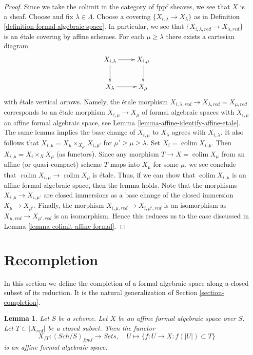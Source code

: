 \documentclass{stacks-project}
\theoremstyle{plain}
\newtheorem{lemma}[subsection]{Lemma}
\theoremstyle{definition}
\theoremstyle{remark}
\numberwithin{equation}{subsection}
\def\colim{\mathop{\mathrm{colim}}\nolimits}
\def\Sch{\mathit{Sch}}
\begin{document}
\begin{proof}
Since we take the colimit in the category of fppf sheaves, we
see that $X$ is a sheaf. Choose and fix $\lambda \in \Lambda$. Choose
a covering $\{X_{i, \lambda} \to X_\lambda\}$ as in Definition
\ref{definition-formal-algebraic-space}. In particular, we see
that $\{X_{i, \lambda, red} \to X_{\lambda, red}\}$ is an
\'etale covering by affine schemes.
For each $\mu \geq \lambda$ there exists a cartesian diagram
$$
\xymatrix{
X_{i, \lambda} \ar[r] \ar[d] & X_{i, \mu} \ar[d] \\
X_\lambda \ar[r] & X_\mu
}
$$
with \'etale vertical arrows. Namely, the \'etale morphism
$X_{i, \lambda, red} \to X_{\lambda, red} = X_{\mu, red}$
corresponds to an \'etale morphism $X_{i, \mu} \to X_\mu$
of formal algebraic spaces with $X_{i, \mu}$ an affine formal
algebraic space, see
Lemma \ref{lemma-affine-identify-affine-etale}.
The same lemma implies the base change of $X_{i, \mu}$ to $X_\lambda$
agrees with $X_{i, \lambda}$. It also follows that
$X_{i, \mu} = X_\mu \times_{X_{\mu'}} X_{i, \mu'}$ for
$\mu' \geq \mu \geq \lambda$. Set $X_i = \colim X_{i, \mu}$.
Then $X_{i, \mu} = X_i \times_X X_\mu$ (as functors).
Since any morphism $T \to X = \colim X_\mu$
from an affine (or quasi-compact) scheme $T$ maps into $X_\mu$
for some $\mu$, we see conclude that
$\colim X_{i, \mu} \to \colim X_\mu$ is \'etale.
Thus, if we can show that $\colim X_{i, \mu}$ is an affine formal
algebraic space, then the lemma holds.
Note that the morphisms $X_{i, \mu} \to X_{i, \mu'}$
are closed immersions as a base change of the closed immersion
$X_\mu \to X_{\mu'}$. Finally, the morphism
$X_{i, \mu, red} \to X_{i, \mu', red}$ is an isomorphism
as $X_{\mu, red} \to X_{\mu', red}$ is an isomorphism.
Hence this reduces us to the case discussed in
Lemma \ref{lemma-colimit-affine-formal}.
\end{proof}








\section{Recompletion}
\label{section-recompletion}

\noindent
In this section we define the completion of a formal algebraic
space along a closed subset of its reduction. It is the natural
generalization of Section \ref{section-completion}.

\begin{lemma}
\label{lemma-completion-affine-formal-is-affine-formal}
Let $S$ be a scheme. Let $X$ be an affine formal algebraic space over $S$.
Let $T \subset |X_{red}|$ be a closed subset. Then the functor
$$
X_{/T} : (\Sch/S)_{fppf} \longrightarrow \textit{Sets},\quad
U \longmapsto \{f : U \to X : f(|U|) \subset T\}
$$
is an affine formal algebraic space.
\end{lemma}
\end{document}

